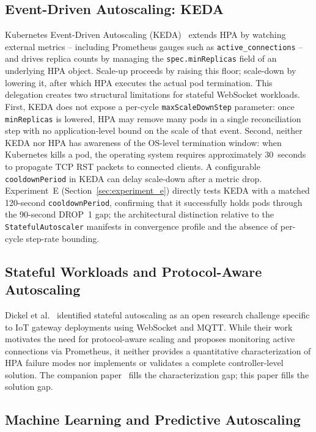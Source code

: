 \documentclass[twocolumn]{svjour3}
\begin{document}
\subsection{Event-Driven Autoscaling: KEDA}

Kubernetes Event-Driven Autoscaling (KEDA)~\cite{keda_docs} extends HPA by watching
external metrics -- including Prometheus gauges such as \texttt{active\_connections} -- and
drives replica counts by managing the \texttt{spec.minReplicas} field of an underlying HPA
object. Scale-up proceeds by raising this floor; scale-down by lowering it, after which HPA
executes the actual pod termination. This delegation creates two structural limitations for
stateful WebSocket workloads. First, KEDA does not expose a per-cycle
\texttt{maxScaleDownStep} parameter: once \texttt{minReplicas} is lowered, HPA may remove
many pods in a single reconciliation step with no application-level bound on the scale of that
event. Second, neither KEDA nor HPA has awareness of the OS-level termination window:
when Kubernetes kills a pod, the operating system requires approximately 30~seconds to
propagate TCP RST packets to connected clients. A configurable \texttt{cooldownPeriod} in
KEDA can delay scale-down after a metric drop. Experiment~E (Section~\ref{sec:experiment_e})
directly tests KEDA with a matched 120-second \texttt{cooldownPeriod}, confirming that it
successfully holds pods through the 90-second DROP~1 gap; the architectural distinction
relative to the \texttt{StatefulAutoscaler} manifests in convergence profile and the absence of
per-cycle step-rate bounding.

\subsection{Stateful Workloads and Protocol-Aware Autoscaling}

Dickel et al.~\cite{dickel2019stateful} identified stateful autoscaling as an open research
challenge specific to IoT gateway deployments using WebSocket and MQTT. While their work
motivates the need for protocol-aware scaling and proposes monitoring active connections via
Prometheus, it neither provides a quantitative characterization of HPA failure modes nor
implements or validates a complete controller-level solution. The companion
paper~\cite{behera2026hpa} fills the characterization gap; this paper fills the solution gap.

\subsection{Machine Learning and Predictive Autoscaling}
\end{document}
